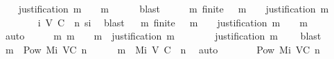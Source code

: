 \begin{isabellebody}
\ \ \isamarkupfalse%
\ {\isachardoublequoteopen}justification\ m\ {\isasymsubseteq}\ {\isasymsigma}\ {\isasymunion}\ {\isacharbraceleft}m{\isacharbraceright}{\isachardoublequoteclose}\isanewline
\ \ \ \ \isamarkupfalse%
\ blast\isanewline
\ \ \isamarkupfalse%
\ \isamarkupfalse%
\ {\isachardoublequoteopen}{\isasymAnd}m{\isacharprime}{\isachardot}\ finite\ {\isasymsigma}\ {\isasymand}\ m{\isacharprime}\ {\isasymin}\ {\isasymsigma}\ {\isasymLongrightarrow}\ justification\ m{\isacharprime}\ {\isasymsubseteq}\ {\isasymsigma}{\isachardoublequoteclose}\isanewline
\ \ \ \ \isamarkupfalse%
\ {\isacartoucheopen}{\isasymsigma}\ {\isasymin}\ {\isasymSigma}i\ {\isacharparenleft}V{\isacharcomma}\ C{\isacharcomma}\ {\isasymepsilon}{\isacharparenright}\ n{\isacartoucheclose}\ si\ \isamarkupfalse%
\ blast\isanewline
\ \ \isamarkupfalse%
{\isachardoublequoteopen}{\isasymAnd}m{\isacharprime}{\isachardot}\ finite\ {\isasymsigma}\ {\isasymand}\ m{\isacharprime}\ {\isasymin}\ {\isasymsigma}\ {\isasymLongrightarrow}\ justification\ m{\isacharprime}\ {\isasymsubseteq}\ {\isasymsigma}\ {\isasymunion}\ {\isacharbraceleft}m{\isacharbraceright}{\isachardoublequoteclose}\isanewline
\ \ \ \ \isamarkupfalse%
\ auto\isanewline
\ \ \isamarkupfalse%
\ \isamarkupfalse%
\ {\isachardoublequoteopen}{\isasymAnd}m{\isacharprime}{\isachardot}\ m{\isacharprime}\ {\isasymin}\ {\isasymsigma}\ {\isasymunion}\ {\isacharbraceleft}m{\isacharbraceright}\ {\isasymLongrightarrow}\ justification\ m\ {\isasymsubseteq}\ {\isasymsigma}{\isachardoublequoteclose}\isanewline
\ \ \ \ \isamarkupfalse%
\ {\isacartoucheopen}justification\ m\ {\isasymsubseteq}\ {\isasymsigma}{\isacartoucheclose}\ \isamarkupfalse%
\ blast\isanewline
\isanewline
\ \ \isamarkupfalse%
\ {\isachardoublequoteopen}{\isacharbraceleft}m{\isacharbraceright}\ {\isasymin}\ Pow\ {\isacharparenleft}Mi\ {\isacharparenleft}V{\isacharcomma}C{\isacharcomma}{\isasymepsilon}{\isacharparenright}\ n{\isacharparenright}{\isachardoublequoteclose}\isanewline
\ \ \ \ \isamarkupfalse%
\ {\isacartoucheopen}m\ {\isasymin}\ Mi\ {\isacharparenleft}V{\isacharcomma}\ C{\isacharcomma}\ {\isasymepsilon}{\isacharparenright}\ n{\isacartoucheclose}\ \isamarkupfalse%
\ auto\isanewline
\ \ \isamarkupfalse%
\ \isamarkupfalse%
\ {\isachardoublequoteopen}{\isasymsigma}\ {\isasymin}\ Pow\ {\isacharparenleft}Mi\ {\isacharparenleft}V{\isacharcomma}C{\isacharcomma}{\isasymepsilon}{\isacharparenright}\ {\isacharparenleft}n{\isacharminus}{}{\isacharparenright}{\isacharparenright}{\isachardoublequoteclose}\isanewline

\end{isabellebody}
